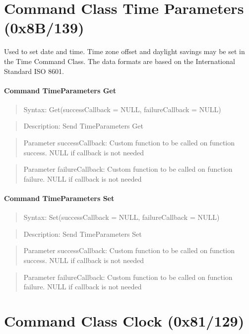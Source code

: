 \section{Command Class Time Parameters (0x8B/139)}

Used to set date and time. Time zone offset and daylight savings may be set in the Time Command Class. The data formats are based on the International Standard ISO 8601.
\paragraph{Command TimeParameters Get}
\begin{quote}Syntax: Get(successCallback = NULL, failureCallback = NULL)\end{quote}
\begin{quote}Description: Send TimeParameters Get\end{quote}
\begin{quote}Parameter successCallback: Custom function to be called on function success. NULL if callback is not needed\end{quote}
\begin{quote}Parameter failureCallback: Custom function to be called on function failure. NULL if callback is not needed\end{quote}


\paragraph{Command TimeParameters Set}
\begin{quote}Syntax: Set(successCallback = NULL, failureCallback = NULL)\end{quote}
\begin{quote}Description: Send TimeParameters Set\end{quote}
\begin{quote}Parameter successCallback: Custom function to be called on function success. NULL if callback is not needed\end{quote}
\begin{quote}Parameter failureCallback: Custom function to be called on function failure. NULL if callback is not needed\end{quote}



\section{Command Class Clock (0x81/129)}


